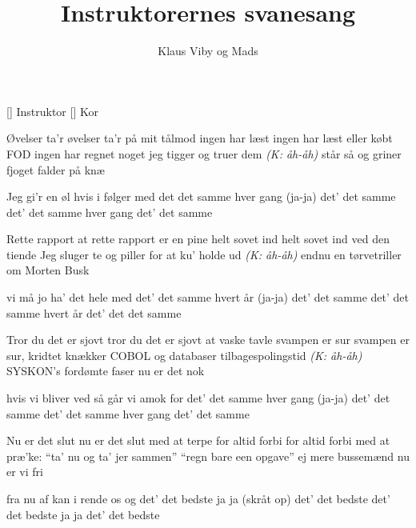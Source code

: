\documentclass[a4paper,11pt]{article}
\title{Instruktorernes svanesang}
\author{Klaus Viby og Mads}
\begin{document}
\maketitle

\begin{roles}
[] Instruktor
[] Kor
\end{roles}

\begin{song}
     Øvelser ta'r
              øvelser ta'r på mit tålmod
              ingen har læst
              ingen har læst eller købt FOD
              ingen har regnet noget
              jeg tigger og truer dem \emph{(K: åh-åh)}
              står så og griner fjoget
              falder på knæ

     Jeg gi'r en øl hvis i følger med
              det det samme hver gang (ja-ja)
              det' det samme
              det' det samme hver gang
              det' det samme

     Rette rapport
              at rette rapport er en pine
              helt sovet ind
              helt sovet ind ved den tiende
              Jeg sluger te og piller
              for at ku' holde ud \emph{(K: åh-åh)}
              endnu en tørvetriller
              om Morten Busk

     vi må jo ha' det hele med
              det' det samme hvert år (ja-ja)
              det' det samme
              det' det samme hvert år
              det' det det samme

     Tror du det er sjovt
              tror du det er sjovt at vaske tavle
              svampen er sur
              svampen er sur, kridtet knækker
              COBOL og databaser
              tilbagespolingstid \emph{(K: åh-åh)}
              SYSKON's fordømte faser
              nu er det nok

     hvis vi bliver ved så går vi amok
              for det' det samme hver gang (ja-ja)
              det' det samme
              det' det samme hver gang
              det' det samme

     Nu er det slut
              nu er det slut med at terpe
              for altid forbi
              for altid forbi med at præ'ke:
              ``ta' nu og ta' jer sammen''
              ``regn bare een opgave''
              ej mere bussemænd
              nu er vi fri

     fra nu af kan i rende os
              og det' det bedste ja ja (skråt op)
              det' det bedste
              det' det bedste ja ja
              det' det bedste
\end{song}
\end{document}

